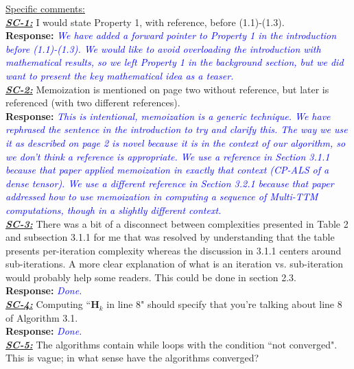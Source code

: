 \documentclass{article}
\newcommand{\mat}[1]{\mathbf{#1}}
\newcommand{\response}[1]{\textbf{Response:} \textcolor{blue}{\textit{#1}}\\}
\begin{document}
\noindent \underline{Specific comments:}\\

\noindent \ul{\textit{\textbf{SC-1:}}} I would state Property 1, with reference, before (1.1)-(1.3).\\

\response{We have added a forward pointer to Property 1 in the introduction before (1.1)-(1.3).  We would like to avoid overloading the introduction with mathematical results, so we left Property 1 in the background section, but we did want to present the key mathematical idea as a teaser.}

\noindent \ul{\textit{\textbf{SC-2:}}} Memoization is mentioned on page two without reference, but later is referenced (with two different references).\\

\response{This is intentional, memoization is a generic technique.   We have rephrased the sentence in the introduction to try and clarify this.  The way we use it as described on page 2 is novel because it is in the context of our algorithm, so we don't think a reference is appropriate.  We use a reference in Section 3.1.1 because that paper applied memoization in exactly that context (CP-ALS of a dense tensor).  We use a different reference in Section 3.2.1 because that paper addressed how to use memoization in computing a sequence of Multi-TTM computations, though in a slightly different context.}

\noindent \ul{\textit{\textbf{SC-3:}}} There was a bit of a disconnect between complexities presented in Table 2 and subsection 3.1.1 for me that was resolved by understanding that the table presents per-iteration complexity whereas the discussion in 3.1.1 centers around sub-iterations. A more clear explanation of what is an iteration vs. sub-iteration would probably help some readers. This could be done in section 2.3.\\

\response{Done.}

\noindent \ul{\textit{\textbf{SC-4:}}} Computing ``$\mat{H}_k$ in line 8" should specify that you're talking about line 8 of Algorithm 3.1.\\

\response{Done.}

\noindent \ul{\textit{\textbf{SC-5:}}} The algorithms contain while loops with the condition ``not converged". This is vague; in what sense have the algorithms converged?\\
\end{document}
